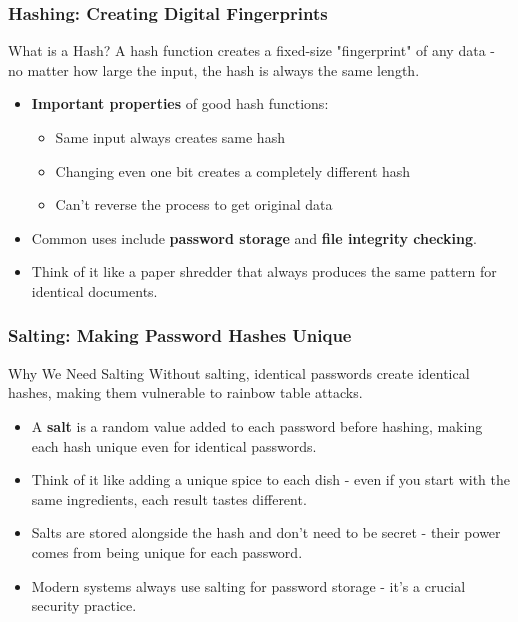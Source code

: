 \documentclass{beamer}
\begin{document}
\begin{frame}
    \frametitle{Hashing: Creating Digital Fingerprints}
    
    \begin{block}{What is a Hash?}
        A hash function creates a fixed-size "fingerprint" of any data - no matter how large the input, the hash is always the same length.
    \end{block}
    
    \begin{itemize}
        \item \textbf{Important properties} of good hash functions:
            \begin{itemize}
                \item Same input always creates same hash
                \item Changing even one bit creates a completely different hash
                \item Can't reverse the process to get original data
            \end{itemize}
        
        \item Common uses include \textbf{password storage} and \textbf{file integrity checking}.
        
        \item Think of it like a paper shredder that always produces the same pattern for identical documents.
    \end{itemize}
\end{frame}

\begin{frame}
    \frametitle{Salting: Making Password Hashes Unique}
    
    \begin{alertblock}{Why We Need Salting}
        Without salting, identical passwords create identical hashes, making them vulnerable to rainbow table attacks.
    \end{alertblock}
    
    \begin{itemize}
        \item A \textbf{salt} is a random value added to each password before hashing, making each hash unique even for identical passwords.
        
        \item Think of it like adding a unique spice to each dish - even if you start with the same ingredients, each result tastes different.
        
        \item Salts are stored alongside the hash and don't need to be secret - their power comes from being unique for each password.
        
        \item Modern systems always use salting for password storage - it's a crucial security practice.
    \end{itemize}
\end{frame}
\end{document}
